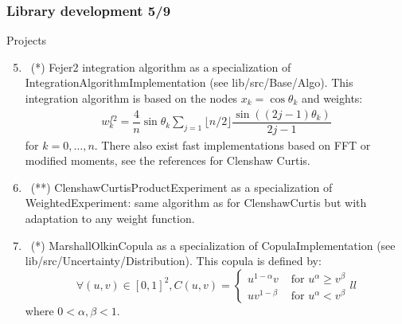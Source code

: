 \documentclass[8pt]{beamer}
\begin{document}
\begin{frame}
  \frametitle{Library development 5/9}
  \begin{block}{Projects}
    \begin{enumerate}
      \setcounter{enumi}{4}
    \item~(*) \alert{\ttfamily Fejer2} integration algorithm as a specialization of  \alert{\ttfamily IntegrationAlgorithmImplementation} (see {\ttfamily lib/src/Base/Algo}). This integration algorithm is based on the nodes $x_k=\cos\theta_k$ and weights:
      \begin{align}
        w_k^{f2}=\dfrac{4}{n}\sin\theta_k\sum_{j=1}{\lfloor n/2\rfloor}\dfrac{\sin\left((2j-1)\theta_k\right)}{2j-1}
      \end{align}
      for $k=0,\dots,n$. There also exist fast implementations based on FFT or modified moments, see the references for Clenshaw Curtis.
    \item~(**) \alert{\ttfamily ClenshawCurtisProductExperiment} as a specialization of {\ttfamily WeightedExperiment}: same algorithm as for {\ttfamily ClenshawCurtis} but with adaptation to any weight function.
    \item~(*) \alert{\ttfamily MarshallOlkinCopula} as a specialization of {\ttfamily CopulaImplementation} (see {\ttfamily lib/src/Uncertainty/Distribution}). This copula is defined by:
      \begin{equation}
        \forall (u,v)\in[0,1]^2, C(u, v)=\left\{
          \begin{array}{ll}
            u^{1-\alpha}v & \mbox{ for }u^\alpha\geq v^\beta \\
            uv^{1-\beta} & \mbox{ for }u^\alpha< v^\beta
          \end{array}{ll}
        \right.
      \end{equation}
      where $0<\alpha, \beta<1$.
    \end{enumerate}
  \end{block}
\end{frame}
\end{document}
